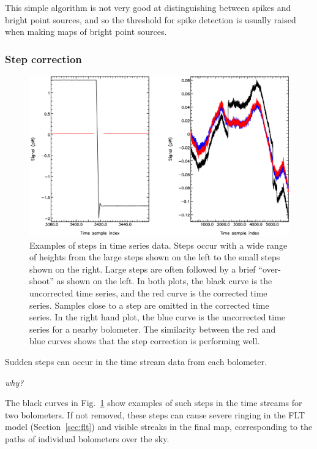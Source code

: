 \documentclass[useAMS,usenatbib,nofootinbib]{mn2e}
\begin{document}
This simple algorithm is not very good at distinguishing between spikes
and bright point sources, and so the threshold for spike detection is
usually raised when making maps of bright point sources.

\subsubsection{Step correction}
\label{sec:steps}

\begin{figure}
\centering
\includegraphics[width=\linewidth]{steps1.pdf}
\caption{Examples of steps in time series data. Steps occur with a wide
range of heights from the large steps shown on the left to the small
steps shown on the right. Large steps are often followed by a brief
``over-shoot'' as shown on the left. In both plots, the black curve is
the uncorrected time series, and the red curve is the corrected time
series. Samples close to a step are omitted in the corrected time series.
In the right hand plot, the blue curve is the uncorrected time series for
a nearby bolometer. The similarity between the red and blue curves shows
that the step correction is performing well.
}
\label{fig:steps1}
\end{figure}

Sudden steps can occur in the time stream data from each bolometer.

\emph{why?}

The black curves in Fig.~\ref{fig:steps1} show examples of such steps in
the time streams for two bolometers. If not removed, these steps can
cause severe ringing in the FLT model (Section~\ref{sec:flt}) and visible
streaks in the final map, corresponding to the paths of individual
bolometers over the sky.
\end{document}
